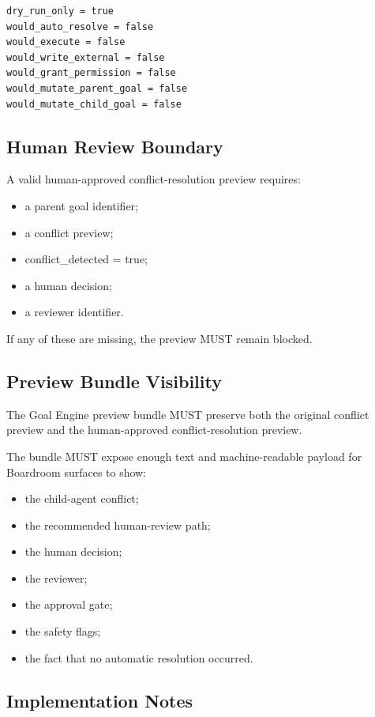 \begin{verbatim}
dry_run_only = true
would_auto_resolve = false
would_execute = false
would_write_external = false
would_grant_permission = false
would_mutate_parent_goal = false
would_mutate_child_goal = false
\end{verbatim}

\subsection{Human Review Boundary}

A valid human-approved conflict-resolution preview requires:

\begin{itemize}
  \item a parent goal identifier;
  \item a conflict preview;
  \item conflict_detected = true;
  \item a human decision;
  \item a reviewer identifier.
\end{itemize}

If any of these are missing, the preview MUST remain blocked.

\subsection{Preview Bundle Visibility}

The Goal Engine preview bundle MUST preserve both the original conflict preview and the human-approved conflict-resolution preview.

The bundle MUST expose enough text and machine-readable payload for Boardroom surfaces to show:

\begin{itemize}
  \item the child-agent conflict;
  \item the recommended human-review path;
  \item the human decision;
  \item the reviewer;
  \item the approval gate;
  \item the safety flags;
  \item the fact that no automatic resolution occurred.
\end{itemize}

\subsection{Implementation Notes}

